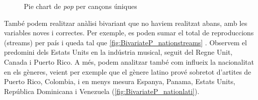 \begin{figure}[H]
\begin{minipage}{.4\textwidth}
        \caption{Pie chart de \textit{pop} per cançons úniques}
        \label{fig:UnivariateP_t_pop}
    \end{minipage}%
\end{figure}

També podem realitzar anàlisi bivariant que no haviem realitzat abans, amb les variables noves i correctes. Per exemple, es poden sumar el total de reproduccions (streams) per país i queda tal que \ref{fig:BivariateP_nationstreams} . Observem el predomini dels Estats Units en la indústria musical, seguit del Regne Unit, Canada i Puerto Rico. A més, podem analitzar també com influeix la nacionalitat en els gèneres, veient per exemple que el gènere latino prové sobretot d'artites de Puerto Rico, Colombia, i en menys mesura Espanya, Panama, Estats Units, República Dominicana i Venezuela (\ref{fig:BivariateP_nationlati}).

